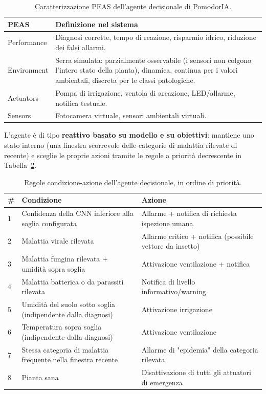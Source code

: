 \begin{table}[h]
\centering
\small
\begin{tabular}{@{}p{1.6cm}p{11.2cm}@{}}
\toprule
\textbf{PEAS} & \textbf{Definizione nel sistema} \\
\midrule
Performance & Diagnosi corrette, tempo di reazione, risparmio idrico, riduzione dei falsi allarmi. \\
Environment & Serra simulata: parzialmente osservabile (i sensori non colgono l'intero stato della pianta), dinamica, continua per i valori ambientali, discreta per le classi patologiche. \\
Actuators & Pompa di irrigazione, ventola di areazione, LED/allarme, notifica testuale. \\
Sensors & Fotocamera virtuale, sensori ambientali virtuali. \\
\bottomrule
\end{tabular}
\caption*{Caratterizzazione PEAS dell'agente decisionale di PomodorIA.}
\label{tab:peas}
\end{table}

L'agente è di tipo \textbf{reattivo basato su modello e su obiettivi}:
mantiene uno stato interno (una finestra scorrevole delle categorie di
malattia rilevate di recente) e sceglie le proprie azioni tramite le regole
a priorità decrescente in Tabella~\ref{tab:regole-agente}.

\clearpage
\begin{table}[h]
\centering
\small
\begin{tabular}{@{}p{0.7cm}p{5.2cm}p{6.9cm}@{}}
\toprule
\textbf{\#} & \textbf{Condizione} & \textbf{Azione} \\
\midrule
1 & Confidenza della CNN inferiore alla soglia configurata & Allarme + notifica di richiesta ispezione umana \\
2 & Malattia virale rilevata & Allarme critico + notifica (possibile vettore da insetto) \\
3 & Malattia fungina rilevata + umidità sopra soglia & Attivazione ventilazione + notifica \\
4 & Malattia batterica o da parassiti rilevata & Notifica di livello informativo/warning \\
5 & Umidità del suolo sotto soglia (indipendente dalla diagnosi) & Attivazione irrigazione \\
6 & Temperatura sopra soglia (indipendente dalla diagnosi) & Attivazione ventilazione \\
7 & Stessa categoria di malattia frequente nella finestra recente & Allarme di "epidemia" della categoria rilevata \\
8 & Pianta sana & Disattivazione di tutti gli attuatori di emergenza \\
\bottomrule
\end{tabular}
\caption{Regole condizione-azione dell'agente decisionale, in ordine di priorità.}
\label{tab:regole-agente}
\end{table}

